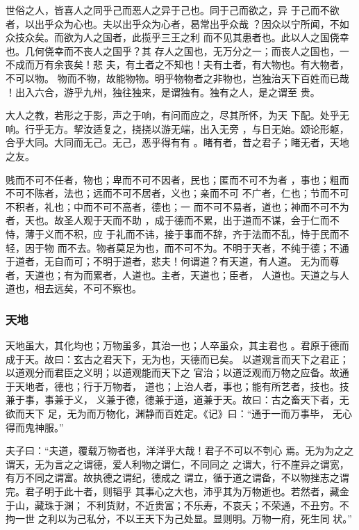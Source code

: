 \documentclass[]{article}
\begin{document}
世俗之人，皆喜人之同乎己而恶人之异于己也。同于己而欲之，异
于己而不欲者，以出乎众为心也。夫以出乎众为心者，曷常出乎众哉
？因众以宁所闻，不如众技众矣。而欲为人之国者，此揽乎三王之利
而不见其患者也。此以人之国侥幸也。几何侥幸而不丧人之国乎？其
存人之国也，无万分之一；而丧人之国也，一不成而万有余丧矣！悲
夫，有土者之不知也！夫有土者，有大物也。有大物者，不可以物。
物而不物，故能物物。明乎物物者之非物也，岂独治天下百姓而已哉
！出入六合，游乎九州，独往独来，是谓独有。独有之人，是之谓至 贵。

大人之教，若形之于影，声之于响，有问而应之，尽其所怀，为天
下配。处乎无响。行乎无方。挈汝适复之，挠挠以游无端，出入无旁
，与日无始。颂论形躯，合乎大同。大同而无己。无己，恶乎得有有
。睹有者，昔之君子；睹无者，天地之友。

贱而不可不任者，物也；卑而不可不因者，民也；匿而不可不为者
，事也；粗而不可不陈者，法也；远而不可不居者，义也；亲而不可
不广者，仁也；节而不可不积者，礼也；中而不可不高者，德也；一
而不可不易者，道也；神而不可不为者，天也。故圣人观于天而不助
，成于德而不累，出于道而不谋，会于仁而不恃，薄于义而不积，应
于礼而不讳，接于事而不辞，齐于法而不乱，恃于民而不轻，因于物
而不去。物者莫足为也，而不可不为。不明于天者，不纯于德；不通
于道者，无自而可；不明于道者，悲夫！何谓道？有天道，有人道。
无为而尊者，天道也；有为而累者，人道也。主者，天道也；臣者，
人道也。天道之与人道也，相去远矣，不可不察也。

\hypertarget{header-n2135}{%
\subsubsection{天地}\label{header-n2135}}

天地虽大，其化均也；万物虽多，其治一也；人卒虽众，其主君也
。君原于德而成于天。故曰：玄古之君天下，无为也，天德而已矣。
以道观言而天下之君正；以道观分而君臣之义明；以道观能而天下之
官治；以道泛观而万物之应备。故通于天地者，德也；行于万物者，
道也；上治人者，事也；能有所艺者，技也。技兼于事，事兼于义，
义兼于德，德兼于道，道兼于天。故曰：古之畜天下者，无欲而天下
足，无为而万物化，渊静而百姓定。《记》曰：``通于一而万事毕，
无心得而鬼神服。''

夫子曰：``夫道，覆载万物者也，洋洋乎大哉！君子不可以不刳心
焉。无为为之之谓天，无为言之之谓德，爱人利物之谓仁，不同同之
之谓大，行不崖异之谓宽，有万不同之谓富。故执德之谓纪，德成之
谓立，循于道之谓备，不以物挫志之谓完。君子明于此十者，则韬乎
其事心之大也，沛乎其为万物逝也。若然者，藏金于山，藏珠于渊；
不利货财，不近贵富；不乐寿，不哀夭；不荣通，不丑穷。不拘一世
之利以为己私分，不以王天下为己处显。显则明。万物一府，死生同 状。''
\end{document}
